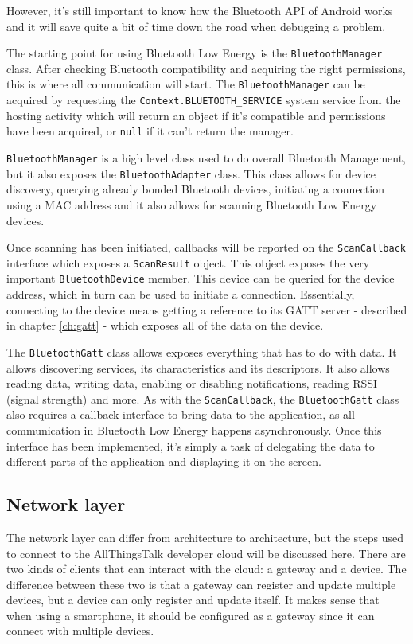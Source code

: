 \documentclass[pdftex,a4paper,12pt,twoside]{report}
\begin{document}
However, it's still important to know how the Bluetooth API of Android works and it will save quite a bit of time down the road when debugging a problem.

The starting point for using Bluetooth Low Energy is the \texttt{BluetoothManager} class. After checking Bluetooth compatibility and acquiring the right permissions, this is where all communication will start. The \texttt{BluetoothManager} can be acquired by requesting the \texttt{Context.BLUETOOTH\_SERVICE} system service from the hosting activity which will return an object if it's compatible and permissions have been acquired, or \texttt{null} if it can't return the manager.

\texttt{BluetoothManager} is a high level class used to do overall Bluetooth Management, but it also exposes the \texttt{BluetoothAdapter} class. This class allows for device discovery, querying already bonded Bluetooth devices, initiating a connection using a MAC address and it also allows for scanning Bluetooth Low Energy devices.

Once scanning has been initiated, callbacks will be reported on the \texttt{ScanCallback} interface which exposes a \texttt{ScanResult} object. This object exposes the very important \texttt{BluetoothDevice} member. This device can be queried for the device address, which in turn can be used to initiate a connection. Essentially, connecting to the device means getting a reference to its GATT server - described in chapter \ref{ch:gatt} - which exposes all of the data on the device.

The \texttt{BluetoothGatt} class allows exposes everything that has to do with data. It allows discovering services, its characteristics and its descriptors. It also allows reading data, writing data, enabling or disabling notifications, reading RSSI (signal strength) and more. As with the \texttt{ScanCallback}, the \texttt{BluetoothGatt} class also requires a callback interface to bring data to the application, as all communication in Bluetooth Low Energy happens asynchronously. Once this interface has been implemented, it's simply a task of delegating the data to different parts of the application and displaying it on the screen.

\subsection{Network layer}
\label{subsec:networklayer}
The network layer can differ from architecture to architecture, but the steps used to connect to the AllThingsTalk developer cloud will be discussed here. There are two kinds of clients that can interact with the cloud: a gateway and a device. The difference between these two is that a gateway can register and update multiple devices, but a device can only register and update itself. It makes sense that when using a smartphone, it should be configured as a gateway since it can connect with multiple devices.
\end{document}
